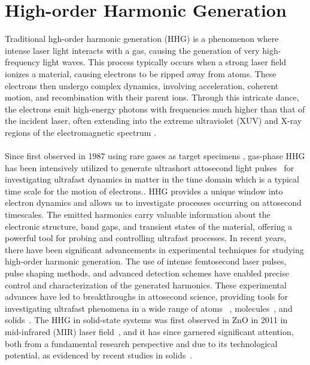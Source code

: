 \section{High-order Harmonic Generation}
Traditional hgh-order harmonic generation (\gls{HHG}) is a phenomenon where intense laser light interacts with a gas, causing the generation of very high-frequency light waves. This process typically occurs when a strong laser field ionizes a material, causing electrons to be ripped away from atoms.
These electrons then undergo complex dynamics, involving acceleration, coherent motion, and recombination with their parent ions. Through this intricate dance, the electrons emit high-energy photons with frequencies much higher than that of the incident laser, often extending into the extreme ultraviolet (XUV) and X-ray regions of the electromagnetic spectrum \cite{gaumnitz2017streaking}.\\
\\
Since first observed in 1987 using rare gases as target specimens \cite{McPherson:87, Ferray_1988},  gas-phase HHG has been intensively utilized to generate ultrashort attosecond light pulses~\cite{PhysRevLett.68.3535, PhysRevLett.70.1599, PhysRevA.49.2117} for investigating ultrafast dynamics in matter in the time domain which is a typical time scale for the motion of electrons.\cite{baltuvska2003attosecond, Goulielmakis2010, doi:10.1126/science.1260311, doi:10.1126/science.aag1268}. HHG provides a unique window into electron dynamics and allows us to investigate processes occurring on attosecond timescales. The emitted harmonics carry valuable information about the electronic structure, band gaps, and transient states of the material, offering a powerful tool for probing and controlling ultrafast processes.
In recent years, there have been significant advancements in experimental techniques for studying high-order harmonic generation. The use of intense femtosecond laser pulses, pulse shaping methods, and advanced detection schemes have enabled precise control and characterization of the generated harmonics. These experimental advances have led to breakthroughs in attosecond science, providing tools for investigating ultrafast phenomena in a wide range of atoms ~\cite{Goulielmakis2010,PhysRevLett.105.143002,PhysRevLett.106.123601}, molecules~\cite{Warrick2016,Reduzzi2016,PhysRevResearch.3.043222}, and solids~\cite{doi:10.1126/science.1260311, doi:10.1126/science.aag1268, Mashiko2016,Siegrist2019, vampa2017merge}.
The HHG in solid-state systems was first observed in ZnO in 2011 in mid-infrared (MIR) laser field~\cite{Ghimire2011}, and it has since garnered significant attention, both from a fundamental research perspective and due to its technological potential, as evidenced by recent studies in solids~\cite{Ghimire2019, Silva2019, Nakagawa2022,gorlach2022high, neufeld2023universal}.


